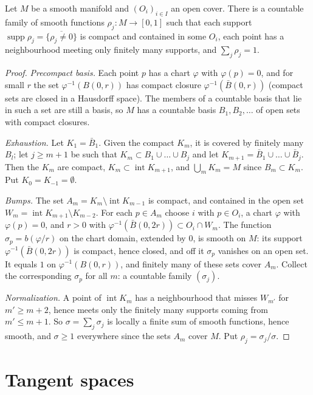 \begin{theorem}\label{thm:partition}
Let $M$ be a smooth manifold and $(O_i)_{i\in I}$ an open cover. There is a countable family of smooth functions $\rho_j\colon M\to[0,1]$ such that each
support $\operatorname{supp}\rho_j=\overline{\{\rho_j\ne0\}}$ is compact and contained in some $O_i$, each point has a neighbourhood meeting only finitely
many supports, and $\sum_j\rho_j=1$.
\end{theorem}
\begin{proof}
\emph{Precompact basis.} Each point $p$ has a chart $\varphi$ with $\varphi(p)=0$, and for small $r$ the set $\varphi^{-1}(B(0,r))$ has compact closure
$\varphi^{-1}(\bar B(0,r))$ (compact sets are closed in a Hausdorff space). The members of a countable basis that lie in such a set are still a basis,
so $M$ has a countable basis $B_1,B_2,\dots$ of open sets with compact closures.

\emph{Exhaustion.} Let $K_1=\bar B_1$. Given the compact $K_m$, it is covered by finitely many $B_l$; let $j\ge m+1$ be such that $K_m\subset B_1\cup\dots\cup B_j$
and let $K_{m+1}=\bar B_1\cup\dots\cup\bar B_j$. Then the $K_m$ are compact, $K_m\subset\operatorname{int}K_{m+1}$, and $\bigcup_mK_m=M$ since
$B_m\subset K_m$. Put $K_0=K_{-1}=\emptyset$.

\emph{Bumps.} The set $A_m=K_m\setminus\operatorname{int}K_{m-1}$ is compact, and contained in the open set $W_m=\operatorname{int}K_{m+1}\setminus K_{m-2}$.
For each $p\in A_m$ choose $i$ with $p\in O_i$, a chart $\varphi$ with $\varphi(p)=0$, and $r>0$ with $\varphi^{-1}(\bar B(0,2r))\subset O_i\cap W_m$. The
function $\sigma_p=b(\varphi/r)$ on the chart domain, extended by $0$, is smooth on $M$: its support $\varphi^{-1}(\bar B(0,2r))$ is compact, hence closed,
and off it $\sigma_p$ vanishes on an open set. It equals $1$ on $\varphi^{-1}(B(0,r))$, and finitely many of these sets cover $A_m$. Collect the
corresponding $\sigma_p$ for all $m$: a countable family $(\sigma_j)$.

\emph{Normalization.} A point of $\operatorname{int}K_m$ has a neighbourhood that misses $W_{m'}$ for $m'\ge m+2$, hence meets only the finitely many
supports coming from $m'\le m+1$. So $\sigma=\sum_j\sigma_j$ is locally a finite sum of smooth functions, hence smooth, and $\sigma\ge1$ everywhere since
the sets $A_m$ cover $M$. Put $\rho_j=\sigma_j/\sigma$.
\end{proof}

\section{Tangent spaces}\label{sec:tangent}

